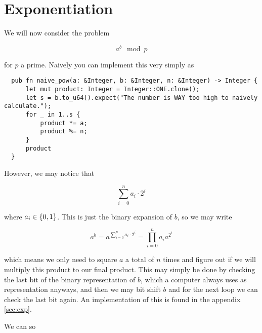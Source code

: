 \section{Exponentiation}

We will now consider the problem 

\begin{equation}
  a^b \mod{p}
  \label{eq:exp}
\end{equation}

for $p$ a prime. Naively you can implement this very simply as

\begin{verbatim}
  pub fn naive_pow(a: &Integer, b: &Integer, n: &Integer) -> Integer {
      let mut product: Integer = Integer::ONE.clone();
      let s = b.to_u64().expect("The number is WAY too high to naively calculate.");
      for _ in 1..s {
          product *= a;
          product %= n;
      }
      product
  }
\end{verbatim}

However, we may notice that

\begin{equation}
  \sum_{i=0}^n a_i \cdot 2^i
  \label{eq:binary_rep}
\end{equation}

where $a_i \in \left\lbrace 0, 1 \right\rbrace$. This is just the binary expansion of $b$, so we may write

\begin{equation}
  a^b = a^{\sum_{i=0}^n a_i \cdot 2^i} = \prod_{i=0}^n a_i a^{2^i}
\end{equation}

which means we only need to square $a$ a total of $n$ times and figure out if we will multiply this product to our final product.
This may simply be done by checking the last bit of the binary representation of $b$, which a computer always uses as representation anyways, and then we may bit shift $b$ and for the next loop we can check the last bit again.
An implementation of this is found in the appendix \ref{sec:exp}.

We can so 
